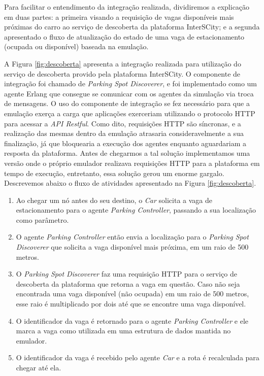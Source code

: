 Para facilitar o entendimento da integração realizada, dividiremos a explicação em duas partes: a primeira visando a requisição de vagas disponíveis mais próximas
do carro ao serviço de descoberta da plataforma InterSCity; e a segunda apresentado o fluxo de atualização do estado de uma vaga de estacionamento (ocupada
ou disponível) baseada na emulação.

A Figura \ref{fig:descoberta} apresenta a integração realizada para utilização do serviço de descoberta provido pela plataforma InterSCity.
O componente de integração foi chamado de \textit{Parking Spot Discoverer}, e foi implementado como um agente Erlang que consegue se comunicar com os agentes da
simulação via troca de mensagens.
O uso do componente de integração se fez necessário para que a emulação exerça a carga que aplicações exerceriam utilizando o protocolo HTTP para acessar
a \textit{API Restful}.
Como dito, requisições HTTP são síncronas, e a realização das mesmas dentro da emulação atrasaria consideravelmente a sua finalização, já que bloquearia a
execução dos agentes enquanto aguardariam a resposta da plataforma.
Antes de chegarmos a tal solução implementamos uma versão onde o próprio emulador realizava requisições HTTP para a plataforma em tempo de execução, entretanto,
essa solução gerou um enorme gargalo.
Descrevemos abaixo o fluxo de atividades apresentado na Figura \ref{fig:descoberta}.

\begin{enumerate}
    \item Ao chegar um nó antes do seu destino, o \textit{Car} solicita a vaga de estacionamento para o agente \textit{Parking Controller}, passando a sua
	localização como parâmetro.

	\item O agente \textit{Parking Controller} então envia a localização para o \textit{Parking Spot Discoverer} que solicita a vaga disponível mais próxima,
	em um raio de 500 metros.

	\item O \textit{Parking Spot Discoverer} faz uma requisição HTTP para o serviço de descoberta da plataforma que retorna a vaga em questão.
	Caso não seja encontrada uma vaga disponível (não ocupada) em um raio de 500 metros, esse raio é multiplicado por dois até que se encontre uma vaga
	disponível.

	\item O identificador da vaga é retornado para o agente \textit{Parking Controller} e ele marca a vaga como utilizada em uma estrutura de dados mantida no emulador.

    \item O identificador da vaga é recebido pelo agente \textit{Car} e a rota é recalculada para chegar até ela.
\end{enumerate}

